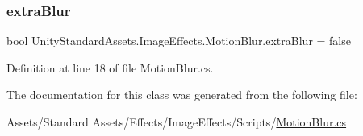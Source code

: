 \subsubsection{\texorpdfstring{extra\+Blur}{extraBlur}}
{\footnotesize\ttfamily bool Unity\+Standard\+Assets.\+Image\+Effects.\+Motion\+Blur.\+extra\+Blur = false}



Definition at line 18 of file Motion\+Blur.\+cs.



The documentation for this class was generated from the following file\+:\begin{DoxyCompactItemize}
\item 
Assets/\+Standard Assets/\+Effects/\+Image\+Effects/\+Scripts/\mbox{\hyperlink{_motion_blur_8cs}{Motion\+Blur.\+cs}}\end{DoxyCompactItemize}
